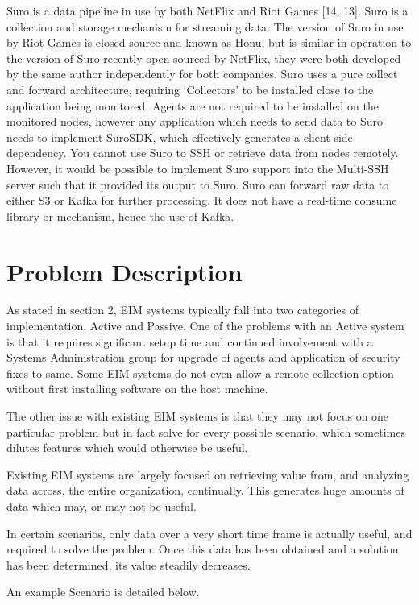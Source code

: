 \documentclass{llncs}
\begin{document}
Suro is a data pipeline in use by both NetFlix and Riot Games [14, 13]. Suro is a collection and storage mechanism for streaming data. The version of Suro in use by Riot Games is closed source and known as Honu, but is similar in operation to the version of Suro recently open sourced by NetFlix, they were both developed by the same author independently for both companies. Suro uses a pure collect and forward architecture, requiring ‘Collectors’ to be installed close to the application being monitored. Agents are not required to be installed on the monitored nodes, however any application which needs to send data to Suro needs to implement SuroSDK, which effectively generates a client side dependency. You cannot use Suro to SSH or retrieve data from nodes remotely. However, it would be possible to implement Suro support into the Multi-SSH server such that it provided its output to Suro. Suro can forward raw data to either S3 or Kafka for further processing. It does not have a real-time consume library or mechanism, hence the use of Kafka.
\newpage
\section{Problem Description}

As stated in section 2, EIM systems typically fall into two categories of implementation, Active and Passive. One of the problems with an Active system is that it requires significant setup time and continued involvement with a Systems Administration group for upgrade of agents and application of security fixes to same. Some EIM systems do not even allow a remote collection option without first installing software on the host machine.

The other issue with existing EIM systems is that they may not focus on one particular problem but in fact solve for every possible scenario, which sometimes dilutes features which would otherwise be useful.

Existing EIM systems are largely focused on retrieving value from, and analyzing data across, the entire organization, continually. This generates huge amounts of data which may, or may not be useful.

In certain scenarios, only data over a very short time frame is actually useful, and required to solve the problem. Once this data has been obtained and a solution has been determined, its value steadily decreases.

An example Scenario is detailed below.
\end{document}
